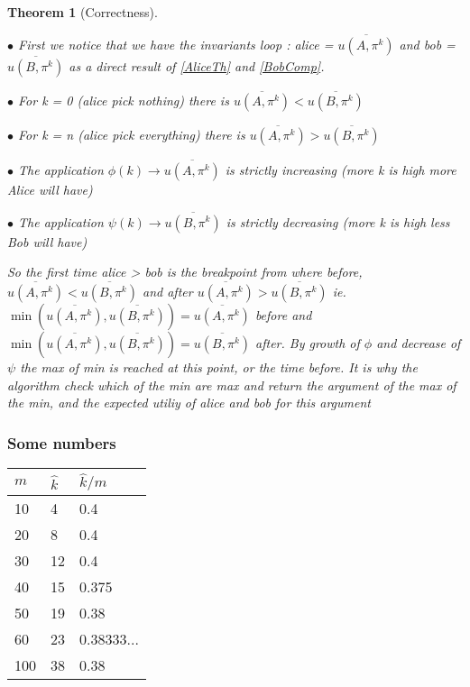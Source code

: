 \documentclass[a4paper, english, 10pt]{article}
\newtheorem{theorem}{Theorem}
\begin{document}
\begin{theorem}[Correctness] \ 
	
	$\bullet$
	First we notice that we have the invariants loop :
	alice = $\overline{u(A, \pi^k)}$ and bob = $ \overline{u(B, \pi^k)} $ as a direct result of \ref{AliceTh} and \ref{BobComp}.
	
	
	$\bullet$ For k = 0 (alice pick nothing) there is $\overline{u(A, \pi^k)} < \overline{u(B, \pi^k)} $
	
	$\bullet$ For k = n (alice pick everything) there is  $\overline{u(A, \pi^k)} > \overline{u(B, \pi^k)} $
	
	$\bullet$ The application $\phi(k) \rightarrow \overline{u(A, \pi^k)} $ is strictly increasing (more k is high more Alice will have)
	
	$\bullet$ The application $\psi(k) \rightarrow \overline{u(B, \pi^k)} $ is strictly decreasing (more k is high less Bob will have)
	
	So the first time alice > bob is the breakpoint from where before, $\overline{u(A, \pi^k)} < \overline{u(B, \pi^k)} $ and after $\overline{u(A, \pi^k)} > \overline{u(B, \pi^k)} $ ie.
	$ \min(\overline{u(A, \pi^k)} ,\overline{u(B, \pi^k)} ) = \overline{u(A, \pi^k)}$ before and 
	$ \min(\overline{u(A, \pi^k)} ,\overline{u(B, \pi^k)} ) = \overline{u(B, \pi^k)} $ after.
	By growth of $\phi$ and decrease of $\psi$ the max of min is reached at this point, or the time before. It is why the algorithm check which of the min are max and return the argument of the max of the min, and the expected utiliy of alice and bob for this argument
	

\end{theorem}

\subsubsection{Some numbers}

\begin{tabular}{lll}
  \toprule
  $m$ & $\hat{k}$ & $\hat{k} / m$\\
  \midrule
  10 & 4 & 0.4\\
  20 & 8 & 0.4\\
  30 & 12 & 0.4\\
  40 & 15 & 0.375\\
  50 & 19 & 0.38\\
  60 & 23 & 0.38333...\\
  100 & 38 & 0.38\\
  \bottomrule
\end{tabular}



% 
% 
\end{document}
